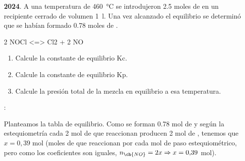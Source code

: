
\begin{exerciseEVAU}
    \textbf{2024}. A una temperatura de \SI{460}{\celsius} se introdujeron \num{2,5} moles de  en un recipiente cerrado de volumen \SI{1}{\litre}.
    Una vez alcanzado el equilibrio se determinó que se habían formado \num{0,78} moles de .
    \begin{reaction*}
        2 NOCl \gas{} <=> Cl2 \gas{} + 2 NO \gas{}
    \end{reaction*}
    \begin{enumerate}[label=\letraminuscula]
        \item Calcule la constante de equilibrio Kc.
        \item Calcule la constante de equilibrio Kp.
        \item Calcule la presión total de la mezcla en equilibrio a esa temperatura.
    \end{enumerate}
    \datos{}: \ctegases{}

    \begin{solu}

    Planteamos la tabla de equilibrio. Como se forman \num{0,78} mol de  y según la estequiometría cada 2 mol de  que reaccionan producen 2 mol de , tenemos que \(x = 0{,}39\) mol (moles de  que reaccionan por cada mol de paso estequiométrico, pero como los coeficientes son iguales, \(n_{\ch{NO}} = 2x \Rightarrow x = 0{,}39\) mol).


\end{solu}
\end{exerciseEVAU}
